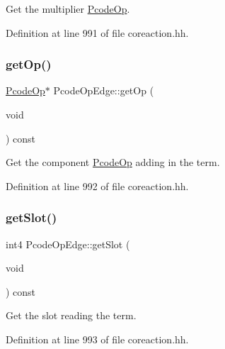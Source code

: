 Get the multiplier \mbox{\hyperlink{class_pcode_op}{Pcode\+Op}}. 



Definition at line 991 of file coreaction.\+hh.

\mbox{\label{class_pcode_op_edge_aa56a59bcdce0127c0139485826907c62}} 
\subsubsection{\texorpdfstring{getOp()}{getOp()}}
{\footnotesize\ttfamily \mbox{\hyperlink{class_pcode_op}{Pcode\+Op}}$\ast$ Pcode\+Op\+Edge\+::get\+Op (\begin{DoxyParamCaption}\item[{void}]{ }\end{DoxyParamCaption}) const\hspace{0.3cm}{\ttfamily [inline]}}



Get the component \mbox{\hyperlink{class_pcode_op}{Pcode\+Op}} adding in the term. 



Definition at line 992 of file coreaction.\+hh.

\mbox{\label{class_pcode_op_edge_a8b40723125dbecd73f094e433fddfcfd}} 
\subsubsection{\texorpdfstring{getSlot()}{getSlot()}}
{\footnotesize\ttfamily int4 Pcode\+Op\+Edge\+::get\+Slot (\begin{DoxyParamCaption}\item[{void}]{ }\end{DoxyParamCaption}) const\hspace{0.3cm}{\ttfamily [inline]}}



Get the slot reading the term. 



Definition at line 993 of file coreaction.\+hh.

\mbox{\label{class_pcode_op_edge_a7370222430597b35d3efd7a6221d7795}} 
